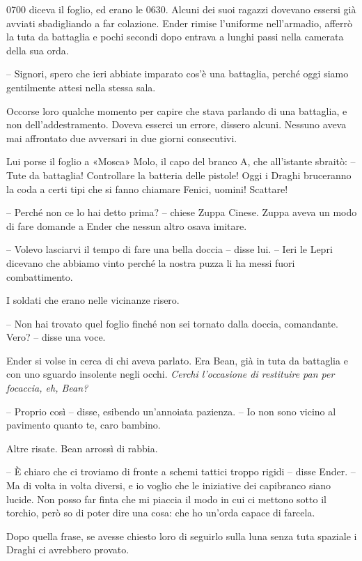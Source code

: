 {0700 diceva il foglio, ed erano le 0630. Alcuni dei suoi ragazzi
	dovevano essersi già avviati sbadigliando a far colazione. Ender rimise
	l'uniforme nell'armadio, afferrò la tuta da battaglia e pochi secondi
	dopo entrava a lunghi passi nella camerata della sua orda.}

{-- Signori, spero che ieri abbiate imparato cos'è una battaglia, perché
	oggi siamo gentilmente attesi nella stessa sala.}

{Occorse loro qualche momento per capire che stava parlando di una
	battaglia, e non dell'addestramento. Doveva esserci un errore, dissero
	alcuni. Nessuno aveva mai affrontato due avversari in due giorni
	consecutivi.}

{Lui porse il foglio a «Mosca» Molo, il capo del branco A, che
	all'istante sbraitò: -- Tute da battaglia! Controllare la batteria delle
	pistole! Oggi i Draghi bruceranno la coda a certi tipi che si fanno
	chiamare Fenici, uomini! Scattare!}

{-- Perché non ce lo hai detto prima? -- chiese Zuppa Cinese. Zuppa
	aveva un modo di fare domande a Ender che nessun altro osava imitare.}

{-- Volevo lasciarvi il tempo di fare una bella doccia -- disse lui. --
	Ieri le Lepri dicevano che abbiamo vinto perché la nostra puzza li ha
	messi fuori combattimento.}

{I soldati che erano nelle vicinanze risero.}

{-- Non hai trovato quel foglio finché non sei tornato dalla doccia,
	comandante. Vero? -- disse una voce.}

{Ender si volse in cerca di chi aveva parlato. Era Bean, già in tuta da
	battaglia e con uno sguardo insolente negli occhi. \emph{Cerchi
		l'occasione di restituire pan per focaccia, eh, Bean?}}

{-- Proprio così -- disse, esibendo un'annoiata pazienza. -- Io non sono
	vicino al pavimento quanto te, caro bambino.}

{Altre risate. Bean arrossì di rabbia.}

{-- È chiaro che ci troviamo di fronte a schemi tattici troppo rigidi --
	disse Ender. -- Ma di volta in volta diversi, e io voglio che le
	iniziative dei capibranco siano lucide. Non posso far finta che mi
	piaccia il modo in cui ci mettono sotto il torchio, però so di poter
	dire una cosa: che ho un'orda capace di farcela.}

{Dopo quella frase, se avesse chiesto loro di seguirlo sulla luna senza
	tuta spaziale i Draghi ci avrebbero provato.}

